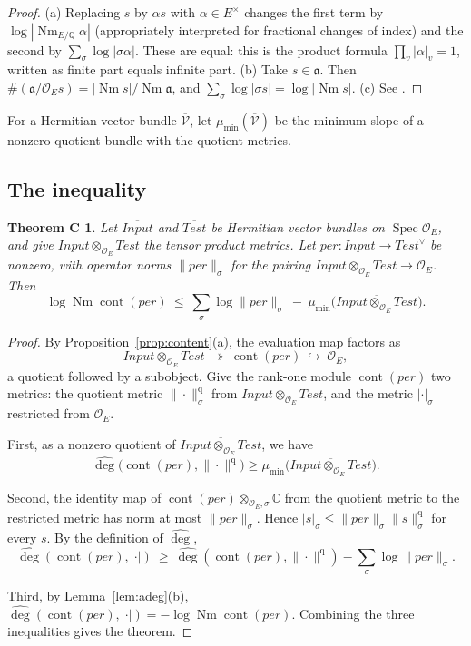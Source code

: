 \documentclass[11pt]{amsart}
\newtheorem*{theoremC}{Theorem C}
\theoremstyle{definition}
\theoremstyle{remark}
\newcommand{\OEring}{\mathcal{O}_E}
\newcommand{\Input}{\mathit{Input}}
\newcommand{\Test}{\mathit{Test}}
\newcommand{\per}{\mathit{per}}
\DeclareMathOperator{\Nm}{Nm}
\DeclareMathOperator{\cont}{cont}
\DeclareMathOperator{\Spec}{Spec}
\newcommand{\adeg}{\widehat{\deg}}
\newcommand{\Q}{\mathbb{Q}}
\newcommand{\C}{\mathbb{C}}
\newcommand{\dual}{^{\vee}}
\begin{document}
\begin{proof}
(a) Replacing $s$ by $\alpha s$ with $\alpha\in E^\times$ changes the first term by $\log|\Nm_{E/\Q}\alpha|$ (appropriately interpreted for fractional changes of index) and the second by $\sum_\sigma\log|\sigma\alpha|$. These are equal: this is the product formula $\prod_v|\alpha|_v=1$, written as finite part equals infinite part.
(b) Take $s\in\mathfrak a$. Then $\#(\mathfrak a/\OEring s)=|\Nm s|/\Nm\mathfrak a$, and $\sum_\sigma\log|\sigma s|=\log|\Nm s|$.
(c) See \cite[\S2]{Bost-Bourbaki}.
\end{proof}

For a Hermitian vector bundle $\overline{\mathcal V}$, let $\mu_{\min}(\overline{\mathcal V})$ be the minimum slope of a nonzero quotient bundle with the quotient metrics.

\subsection{The inequality}
\begin{theoremC}
Let $\overline{\Input}$ and $\overline{\Test}$ be Hermitian vector bundles on $\Spec\OEring$, and give $\Input\otimes_{\OEring}\Test$ the tensor product metrics. Let $\per\colon\Input\to\Test\dual$ be nonzero, with operator norms $\|\per\|_\sigma$ for the pairing $\Input\otimes_{\OEring}\Test\to\OEring$. Then
\[
\log\Nm\cont(\per)\ \le\ \sum_\sigma\log\|\per\|_\sigma\ -\ \mu_{\min}\bigl(\overline{\Input\otimes_{\OEring}\Test}\bigr).
\]
\end{theoremC}

\begin{proof}
By Proposition~\ref{prop:content}(a), the evaluation map factors as
\[
\Input\otimes_{\OEring}\Test\ \twoheadrightarrow\ \cont(\per)\ \hookrightarrow\ \OEring,
\]
a quotient followed by a subobject. Give the rank-one module $\cont(\per)$ two metrics: the quotient metric $\|\cdot\|^{\mathrm q}_\sigma$ from $\Input\otimes_{\OEring}\Test$, and the metric $|\cdot|_\sigma$ restricted from $\OEring$.

First, as a nonzero quotient of $\overline{\Input\otimes_{\OEring}\Test}$, we have
\[
\adeg\bigl(\cont(\per),\|\cdot\|^{\mathrm q}\bigr)\ge\mu_{\min}\bigl(\overline{\Input\otimes_{\OEring}\Test}\bigr).
\]

Second, the identity map of $\cont(\per)\otimes_{\OEring,\sigma}\C$ from the quotient metric to the restricted metric has norm at most $\|\per\|_\sigma$. Hence $|s|_\sigma\le\|\per\|_\sigma\|s\|^{\mathrm q}_\sigma$ for every $s$. By the definition of $\adeg$,
\[
\adeg(\cont(\per),|\cdot|)\ \ge\ \adeg(\cont(\per),\|\cdot\|^{\mathrm q})-\sum_\sigma\log\|\per\|_\sigma .
\]

Third, by Lemma~\ref{lem:adeg}(b), $\adeg(\cont(\per),|\cdot|)=-\log\Nm\cont(\per)$. Combining the three inequalities gives the theorem.
\end{proof}
\end{document}
